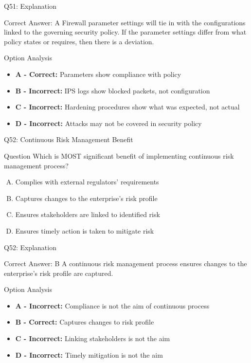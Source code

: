 \documentclass{beamer}
\begin{document}
	\begin{frame}{Q51: Explanation}
		\begin{block}{Correct Answer: A}
			Firewall parameter settings will tie in with the configurations linked to the governing security policy. If the parameter settings differ from what policy states or requires, then there is a deviation.
		\end{block}
		\begin{block}{Option Analysis}
			\begin{itemize}
				\item \textbf{A - Correct:} Parameters show compliance with policy
				\item \textbf{B - Incorrect:} IPS logs show blocked packets, not configuration
				\item \textbf{C - Incorrect:} Hardening procedures show what was expected, not actual
				\item \textbf{D - Incorrect:} Attacks may not be covered in security policy
			\end{itemize}
		\end{block}
	\end{frame}
	
	\begin{frame}{Q52: Continuous Risk Management Benefit}
		\begin{block}{Question}
			Which is MOST significant benefit of implementing continuous risk management process?
		\end{block}
		\begin{enumerate}[(A)]
			\item Complies with external regulators' requirements
			\item Captures changes to the enterprise's risk profile
			\item Ensures stakeholders are linked to identified risk
			\item Ensures timely action is taken to mitigate risk
		\end{enumerate}
	\end{frame}
	
	\begin{frame}{Q52: Explanation}
		\begin{block}{Correct Answer: B}
			A continuous risk management process ensures changes to the enterprise's risk profile are captured.
		\end{block}
		\begin{block}{Option Analysis}
			\begin{itemize}
				\item \textbf{A - Incorrect:} Compliance is not the aim of continuous process
				\item \textbf{B - Correct:} Captures changes to risk profile
				\item \textbf{C - Incorrect:} Linking stakeholders is not the aim
				\item \textbf{D - Incorrect:} Timely mitigation is not the aim
			\end{itemize}
		\end{block}
	\end{frame}
	
\end{document}
